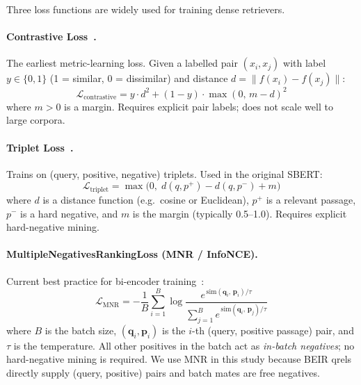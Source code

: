 \documentclass[12pt, a4paper]{article}
\newcommand{\bvec}[1]{\mathbf{#1}}
\begin{document}
Three loss functions are widely used for training dense retrievers.

\paragraph{Contrastive Loss~\citep{hadsell2006dimensionality}.}
The earliest metric-learning loss.  Given a labelled pair $(x_i, x_j)$ with
label $y \in \{0, 1\}$ (1 = similar, 0 = dissimilar) and distance
$d = \|f(x_i) - f(x_j)\|$:
\begin{equation}
  \mathcal{L}_{\text{contrastive}} = y \cdot d^2
    + (1 - y) \cdot \max(0,\, m - d)^2
  \label{eq:contrastive}
\end{equation}
where $m > 0$ is a margin.  Requires explicit pair labels; does not scale
well to large corpora.

\paragraph{Triplet Loss~\citep{schroff2015facenet}.}
Trains on (query, positive, negative) triplets.  Used in the original SBERT:
\begin{equation}
  \mathcal{L}_{\text{triplet}} = \max\!\bigl(0,\;
    d(q, p^+) - d(q, p^-) + m \bigr)
  \label{eq:triplet}
\end{equation}
where $d$ is a distance function (e.g.\ cosine or Euclidean), $p^+$ is a
relevant passage, $p^-$ is a hard negative, and $m$ is the margin (typically
0.5--1.0).  Requires explicit hard-negative mining.

\paragraph{MultipleNegativesRankingLoss (MNR / InfoNCE).}
Current best practice for bi-encoder training~\citep{henderson2017efficient}:
\begin{equation}
  \mathcal{L}_{\text{MNR}} = -\frac{1}{B} \sum_{i=1}^{B}
    \log \frac{e^{\,\text{sim}(\bvec{q}_i,\,\bvec{p}_i) / \tau}}
              {\displaystyle\sum_{j=1}^{B}
               e^{\,\text{sim}(\bvec{q}_i,\,\bvec{p}_j) / \tau}}
  \label{eq:mnr}
\end{equation}
where $B$ is the batch size, $(\bvec{q}_i, \bvec{p}_i)$ is the $i$-th
(query, positive passage) pair, and $\tau$ is the temperature.  All other
positives in the batch act as \emph{in-batch negatives}; no hard-negative
mining is required.  We use MNR in this study because BEIR qrels directly
supply (query, positive) pairs and batch mates are free negatives.
\end{document}
